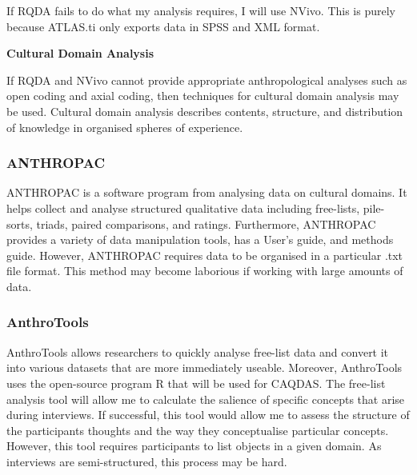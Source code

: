 \documentclass{article}
\begin{document}
If RQDA fails to do what my analysis requires, I will use NVivo. This is purely because ATLAS.ti only exports data in SPSS and XML format.

\begin{center}
\textbf{Cultural Domain Analysis}
\end{center}
If RQDA and NVivo cannot provide appropriate anthropological analyses such as open coding and axial coding, then techniques for cultural domain analysis may be used. Cultural domain analysis describes contents, structure, and distribution of knowledge in organised spheres of experience. 

\subsubsection{ANTHROPAC} 
ANTHROPAC is a software program from analysing data on cultural domains. It helps collect and analyse structured qualitative data including free-lists, pile-sorts, triads, paired comparisons, and ratings. Furthermore, ANTHROPAC provides a variety of data manipulation tools, has a User's guide, and methods guide. However, ANTHROPAC requires data to be organised in a particular .txt file format. This method may become laborious if working with large amounts of data. 

\subsubsection{AnthroTools}
AnthroTools allows researchers to quickly analyse free-list data and convert it into various datasets that are more immediately useable. Moreover, AnthroTools uses the open-source program R that will be used for CAQDAS. The free-list analysis tool will allow me to calculate the salience of specific concepts that arise during interviews. If successful, this tool would allow me to assess the structure of the participants thoughts and the way they conceptualise particular concepts. However, this tool requires participants to list objects in a given domain. As interviews are semi-structured, this process may be hard.
\end{document}

